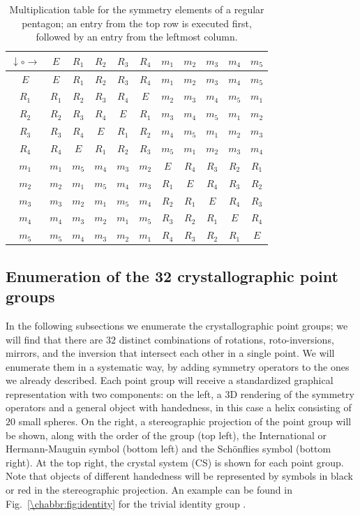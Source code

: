 \begin{table}[h]
\centering\leavevmode
{\small\begin{tabular}{|c|cccccccccc|}
\hline
$\downarrow\circ\rightarrow$ & $E$ & $R_1$ & $R_2$ & $R_3$ & $R_4$ & $m_1$ & $m_2$ & $m_3$ & $m_4$ & $m_5$\\
\hline\hline
$E$     & $E$ & $R_1$ & $R_2$ & $R_3$ & $R_4$ & $m_1$ & $m_2$ & $m_3$ & $m_4$ & $m_5$ \\ 
$R_1$ & $R_1$ & $R_2$ & $R_3$ & $R_4$ & $E$ & $m_2$ & $m_3$ & $m_4$ & $m_5$ & $m_1$ \\ 
$R_2$ & $R_2$ & $R_3$ & $R_4$ & $E$ & $R_1$ & $m_3$ & $m_4$ & $m_5$ & $m_1$ & $m_2$ \\ 
$R_3$ & $R_3$ & $R_4$ & $E$ & $R_1$ & $R_2$ & $m_4$ & $m_5$ & $m_1$ & $m_2$ & $m_3$ \\ 
$R_4$ & $R_4$ & $E$ & $R_1$ & $R_2$ & $R_3$ & $m_5$ & $m_1$ & $m_2$ & $m_3$ & $m_4$ \\ 
$m_1$ & $m_1$ & $m_5$ & $m_4$ & $m_3$ & $m_2$ & $E$ & $R_4$ & $R_3$ & $R_2$ & $R_1$ \\ 
$m_2$ & $m_2$ & $m_1$ & $m_5$ & $m_4$ & $m_3$ & $R_1$ & $E$ & $R_4$ & $R_3$ & $R_2$ \\ 
$m_3$ & $m_3$ & $m_2$ & $m_1$ & $m_5$ & $m_4$ & $R_2$ & $R_1$ & $E$ & $R_4$ & $R_3$ \\ 
$m_4$ & $m_4$ & $m_3$ & $m_2$ & $m_1$ & $m_5$ & $R_3$ & $R_2$ & $R_1$ & $E$ & $R_4$ \\ 
$m_5$ & $m_5$ & $m_4$ & $m_3$ & $m_2$ & $m_1$ & $R_4$ & $R_3$ & $R_2$ & $R_1$ & $E$ \\ 
\hline
\end{tabular}}
\caption{\label{\chabbr:tb:pentagonMT}Multiplication table for the symmetry elements of a regular pentagon; an entry from the top row is executed first, followed by an entry from the leftmost column.}
\end{table}

\subsection{Enumeration of the 32 crystallographic point groups}\label{\chabbr:ssec:CPGs}

In the following subsections we enumerate the crystallographic point groups; we will find that there are $32$ distinct combinations of rotations, roto-inversions, mirrors, and the inversion that intersect each other in a single point. We will enumerate them in a systematic way, by adding symmetry operators to the ones we already described. Each point group will receive a standardized graphical representation with two components: on the left, a 3D rendering of the symmetry operators and a general object with handedness, in this case a helix consisting of $20$ small spheres.  On the right, a stereographic projection of the point group will be shown, along with the order of the group (top left), the International or Hermann-Mauguin symbol (bottom left) and the Sch\"onflies symbol (bottom right).  At the top right, the crystal system (CS) is shown for each point group.  Note that objects of different handedness will be represented by symbols in black or red in the stereographic projection.  An example can be found in Fig.~\ref{\chabbr:fig:identity} for the trivial identity group .

